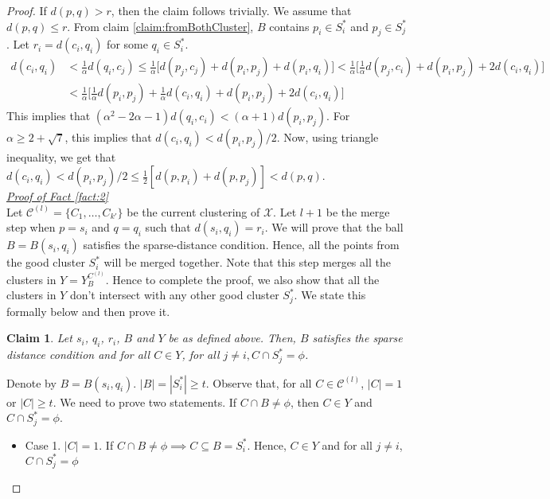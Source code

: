 \documentclass[anon,12pt]{colt2016} %
\newtheorem{claim}[theorem]{Claim}
\newcommand{\mc}{\mathcal}
\begin{document}
\begin{proof}
\vspace{-0.1in} If $d(p, q) > r$, then the claim follows trivially. We assume that $d(p, q) \le r$. From claim \ref{claim:fromBothCluster}, $B$ contains $p_i \in S_i^*$ and $p_j \in S_j^*$. Let $r_i = d(c_i, q_i)$ for some $q_i \in S_i^*$.
\begin{align*}
d(c_i, q_i) &< \frac{1}{\alpha} d(q_i, c_j) \le \frac{1}{\alpha} \bigg[ d(p_j, c_j) + d(p_i, p_j) + d(p_i, q_i)\bigg] < \frac{1}{\alpha} \bigg[ \frac{1}{\alpha}d(p_j, c_i) + d(p_i, p_j) + 2d(c_i, q_i)\bigg]\\
& < \frac{1}{\alpha} \bigg[ \frac{1}{\alpha}d(p_i, p_j) + \frac{1}{\alpha}d(c_i, q_i) + d(p_i, p_j) + 2d(c_i, q_i)\bigg]
\end{align*}
This implies that $(\alpha^2 - 2\alpha - 1)d(q_i, c_i) < (\alpha + 1) d(p_i, p_j)$. For $\alpha \ge 2 + \sqrt 7$, this implies that $d(c_i, q_i) < d(p_i, p_j)/2$. Now, using triangle inequality, we get that $d(c_i, q_i) < d(p_i, p_j)/2 \le \frac{1}{2}[d(p, p_i) + d(p, p_j)] < d(p, q)$.\\

\noindent\textit{\underline{Proof of Fact \ref{fact:2}
}}\\
Let $\mc C^{(l)} = \{C_1, \ldots, C_{k'}\}$ be the current clustering of $\mc X$. Let $l+1$ be the merge step when $p = s_i$ and $q = q_i$ such that $d(s_i, q_i) = r_i$. We will prove that the ball $B = B(s_i, q_i)$ satisfies the sparse-distance condition. Hence, all the points from the good cluster $S_i^*$ will be merged together. Note that this step merges all the clusters in $Y = Y_B^{C^{(l)}}$. Hence to complete the proof, we also show that all the clusters in $Y$ don't intersect with any other good cluster $S_j^*$. We state this formally below and then prove it.

\begin{claim}
\label{claim:dciqi}
Let $s_i$, $q_i$, $r_i$, $B$ and $Y$ be as defined above. Then, $B$ satisfies the sparse distance condition and for all $C \in Y$, for all $j \neq i, C \cap S_j^* = \phi$.
\end{claim}

\vspace{-0.1in} Denote by $B = B(s_i, q_i)$. $|B| = |S_i^*| \ge t$. Observe that, for all $C \in \mc C^{(l)}$, $|C| = 1$ or $|C| \ge t$. We need to prove two statements. If $C \cap B \neq \phi$, then $C \in Y$ and $C \cap S_j^* = \phi$. 

\begin{itemize}[nolistsep]
\item Case 1. $|C| = 1$. If $C \cap B \neq \phi \implies C \subseteq B = S_i^*$. Hence, $C \in Y$ and for all $j \neq i$, $C \cap S_j^* = \phi$


\end{itemize}
\end{proof}
\end{document}
